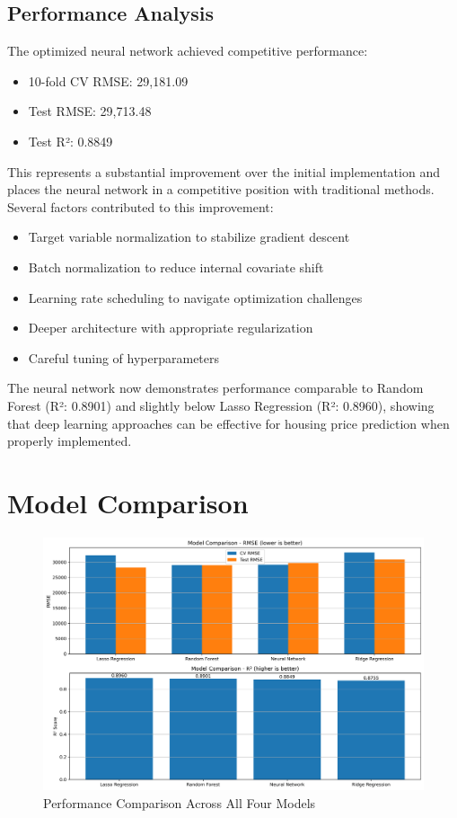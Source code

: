 \documentclass[12pt]{report}
\begin{document}
\subsection{Performance Analysis}
The optimized neural network achieved competitive performance:
\begin{itemize}
    \item 10-fold CV RMSE: 29,181.09
    \item Test RMSE: 29,713.48
    \item Test R²: 0.8849
\end{itemize}

This represents a substantial improvement over the initial implementation and places the neural network in a competitive position with traditional methods. Several factors contributed to this improvement:
\begin{itemize}
    \item Target variable normalization to stabilize gradient descent
    \item Batch normalization to reduce internal covariate shift
    \item Learning rate scheduling to navigate optimization challenges
    \item Deeper architecture with appropriate regularization
    \item Careful tuning of hyperparameters
\end{itemize}

The neural network now demonstrates performance comparable to Random Forest (R²: 0.8901) and slightly below Lasso Regression (R²: 0.8960), showing that deep learning approaches can be effective for housing price prediction when properly implemented.

\section{Model Comparison}
\begin{figure}[H]
    \centering
    \includegraphics[width=1.0\textwidth]{figures/model_comparison.png}
    \caption{Performance Comparison Across All Four Models}
    \label{fig:model_comparison}
\end{figure}
\end{document}

